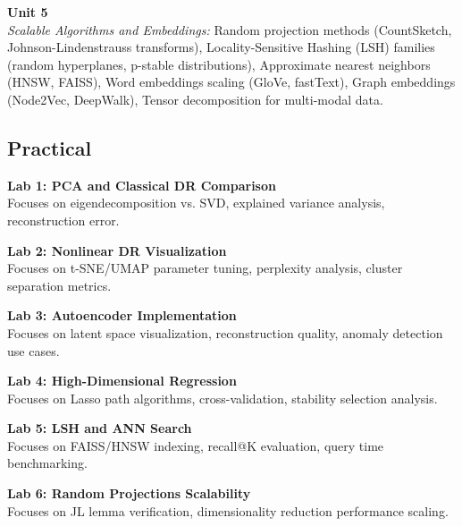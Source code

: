 \vspace{0.3cm}

\noindent\textbf{Unit 5} \\
\textit{Scalable Algorithms and Embeddings:} Random projection methods (CountSketch, Johnson-Lindenstrauss transforms), Locality-Sensitive Hashing (LSH) families (random hyperplanes, p-stable distributions), Approximate nearest neighbors (HNSW, FAISS), Word embeddings scaling (GloVe, fastText), Graph embeddings (Node2Vec, DeepWalk), Tensor decomposition for multi-modal data.

\newpage

\subsection*{Practical}
\noindent\textbf{Lab 1: PCA and Classical DR Comparison} \\
Focuses on eigendecomposition vs. SVD, explained variance analysis, reconstruction error.

\vspace{0.2cm}

\noindent\textbf{Lab 2: Nonlinear DR Visualization} \\
Focuses on t-SNE/UMAP parameter tuning, perplexity analysis, cluster separation metrics.

\vspace{0.2cm}

\noindent\textbf{Lab 3: Autoencoder Implementation} \\
Focuses on latent space visualization, reconstruction quality, anomaly detection use cases.

\vspace{0.2cm}

\noindent\textbf{Lab 4: High-Dimensional Regression} \\
Focuses on Lasso path algorithms, cross-validation, stability selection analysis.

\vspace{0.2cm}

\noindent\textbf{Lab 5: LSH and ANN Search} \\
Focuses on FAISS/HNSW indexing, recall@K evaluation, query time benchmarking.

\vspace{0.2cm}

\noindent\textbf{Lab 6: Random Projections Scalability} \\
Focuses on JL lemma verification, dimensionality reduction performance scaling.

